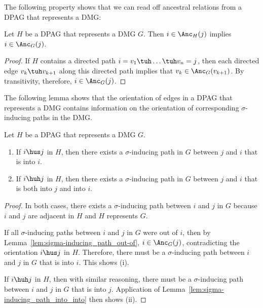 The following property shows that we can read off ancestral relations from a DPAG that represents a DMG:
\begin{Lem}\label{lem:dpag_ancestral_relations}
  Let $H$ be a DPAG that represents a DMG $G$. 
  Then $i \in \Anc_{H}(j)$ implies $i \in \Anc_{G}(j)$.
\end{Lem}
\begin{proof}
  If $H$ contains a directed path $i = v_1 \tuh \dots \tuh v_n = j$,
  then each directed edge $v_k \tuh v_{k+1}$ along this directed path implies that $v_k \in \Anc_G(v_{k+1})$. 
  By transitivity, therefore, $i \in \Anc_G(j)$. 
\end{proof}
The following lemma shows that the orientation of edges in a DPAG that represents a DMG contains
information on the orientation of corresponding $\sigma$-inducing paths in the DMG.
\begin{Lem}\label{lem:sigma-inducing_path_into}
  Let $H$ be a DPAG that represents a DMG $G$. 
  \begin{enumerate}[label=(\roman*)]
    \item If $i \hus j$ in $H$, then there exists a $\sigma$-inducing path in $G$ between $j$ and $i$ that is into $i$.
    \item If $i \huh j$ in $H$, then there exists a $\sigma$-inducing path in $G$ between $j$ and $i$ that is both into $j$ and into $i$.
  \end{enumerate}
\end{Lem}
\begin{proof}
  In both cases, there
  exists a $\sigma$-inducing path between $i$ and $j$ in $G$ because $i$ and $j$ are adjacent in $H$ and $H$ represents $G$.

  If all $\sigma$-inducing paths between $i$ and $j$ in $G$ were out of $i$, then by Lemma~\ref{lem:sigma-inducing_path_out-of},
  $i \in \Anc_G(j)$, contradicting the orientation $i \hus j$ in $H$. 
  Therefore, there must be a $\sigma$-inducing path between $i$ and $j$ in $G$ that is into $i$.
  This shows (i).

  If $i \huh j$ in $H$, then with similar reasoning, there must be a $\sigma$-inducing path between $i$ and $j$ in $G$ that is into $j$.
  Application of Lemma~\ref{lem:sigma-inducing_path_into_into} then shows (ii).
\end{proof}

